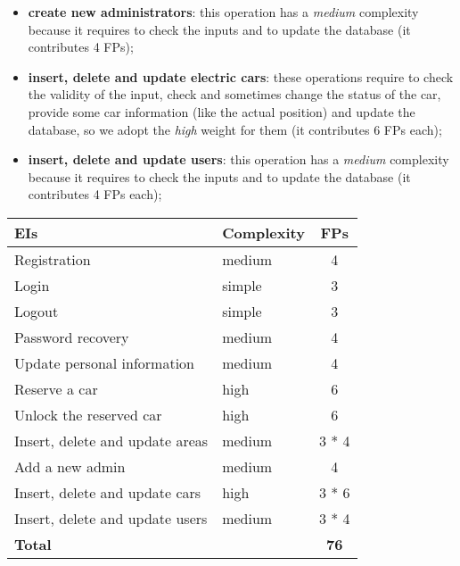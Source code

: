 \begin{itemize}
\begin{itemize}
			\item \textbf{create new administrators}: this operation has a \textit{medium} complexity because it requires to check the inputs and to update the database (it contributes 4 FPs);
			\item \textbf{insert, delete and update electric cars}: these operations require to check the validity of the input, check and sometimes change the status of the car, provide some car information (like the actual position) and update the database, so we adopt the \textit{high} weight for them (it contributes 6 FPs each);
			\item \textbf{insert, delete and update users}: this operation has a \textit{medium} complexity because it requires to check the inputs and to update the database (it contributes 4 FPs each);
		\end{itemize}
\end{itemize}

\begin{center}
	\begin{tabular}{|l|l|c|}
		\hline
		\textbf{EIs} 	& \textbf{Complexity} 	& \textbf{FPs} \\
		\hline
		Registration 	& medium 	& 4 \\
		Login 	& simple 	& 3 \\
		Logout 	& simple 	& 3 \\
		Password recovery 	& medium 	& 4 \\
		Update personal information 	& medium 	& 4 \\
		Reserve a car 	& high 	& 6 \\
		Unlock the reserved car 	& high 	& 6 \\
		Insert, delete and update areas 	& medium 	& 3 * 4 \\
		Add a new admin 	& medium 	& 4 \\
		Insert, delete and update cars 	& high 	& 3 * 6 \\
		Insert, delete and update users 	& medium 	& 3 * 4 \\		
		\hline \hline
		\textbf{Total} 	& 	& \textbf{76} \\
		\hline
	\end{tabular}
\end{center}

